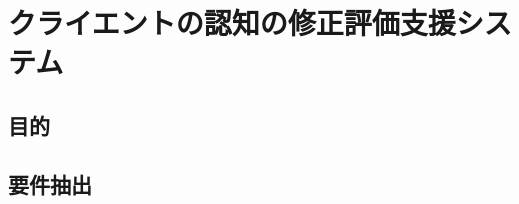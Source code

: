 \documentclass[shuuron]{kuee}
\begin{document}
%
%
%
%
%









\chapter{クライエントの認知の修正評価支援システム}
\section{目的}


\section{要件抽出}

%
\end{document}
